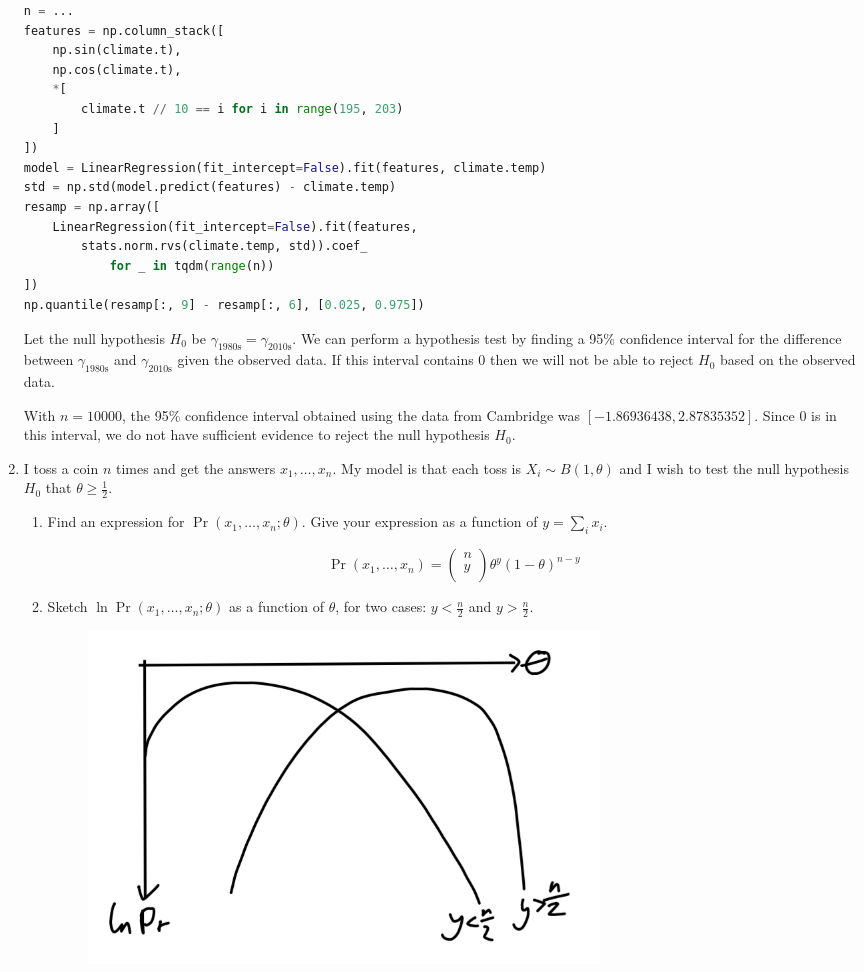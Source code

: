 \documentclass[10pt,\jkfside,a4paper]{article}
\begin{document}
\begin{enumerate}
\begin{lstlisting}[language=Python]
n = ...
features = np.column_stack([
	np.sin(climate.t),
	np.cos(climate.t),
	*[
		climate.t // 10 == i for i in range(195, 203)
	]
])
model = LinearRegression(fit_intercept=False).fit(features, climate.temp)
std = np.std(model.predict(features) - climate.temp)
resamp = np.array([
	LinearRegression(fit_intercept=False).fit(features,
		stats.norm.rvs(climate.temp, std)).coef_
			for _ in tqdm(range(n))
])
np.quantile(resamp[:, 9] - resamp[:, 6], [0.025, 0.975])
\end{lstlisting}

Let the null hypothesis $H_0$ be $\gamma_{\text{1980s}} =
\gamma_{\text{2010s}}$. We can perform a hypothesis test by finding a 95\%
confidence interval for the difference between $\gamma_{\text{1980s}}$ and
$\gamma_{\text{2010s}}$ given the observed data. If this interval contains 0
then we will not be able to reject $H_0$ based on the observed data.

With $n = 10000$, the 95\% confidence interval obtained using the data from
Cambridge was $[-1.86936438, 2.87835352]$. Since 0 is in this interval, we
do not have sufficient evidence to reject the null hypothesis $H_0$.

\item I toss a coin $n$ times and get the answers $x_1, \dots, x_n$. My
model is that each toss is $X_i \sim B(1, \theta)$ and I wish to test the
null hypothesis $H_0$ that $\theta \geq \frac{1}{2}$.

\begin{enumerate}

\item Find an expression for $\Pr(x_1, \dots, x_n ; \theta)$. Give your
expression as a function of $y = \sum_i x_i$.

\[
\Pr(x_1, \dots, x_n) = \begin{pmatrix}
n \\ y \\
\end{pmatrix}
\theta^y(1 - \theta)^{n - y}
\]

\item Sketch $\ln \Pr(x_1, \dots, x_n ; \theta)$ as a function of $\theta$,
for two cases: $y < \frac{n}{2}$ and $y > \frac{n}{2}$.

\begin{figure}[H]
    \centering
   \includegraphics[width=0.7\textwidth]{./cointossing}
\end{figure}


\end{enumerate}
\end{enumerate}
\end{document}

